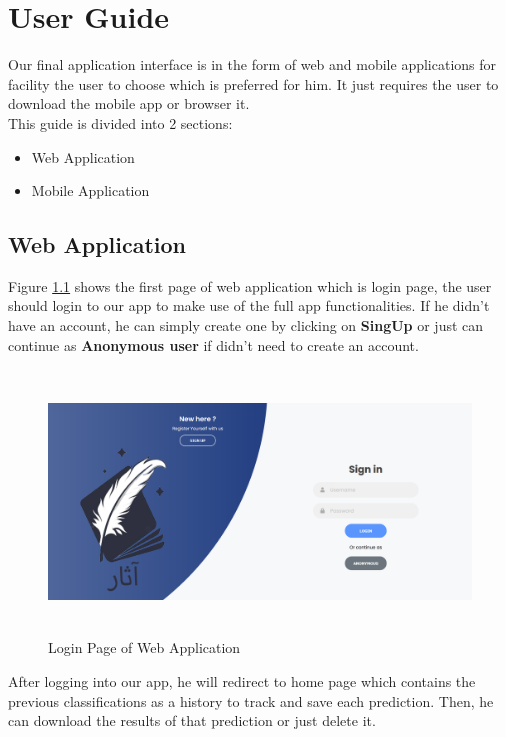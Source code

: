\chapter{User Guide}
Our final application interface is in the form of web and mobile applications for facility the user to choose which is preferred for him. It just requires the user to download the mobile app or browser it. \\

\noindent
This guide is divided into 2 sections:
\begin{itemize}[itemsep=1pt, topsep=5pt]
    \item Web Application
    \item Mobile Application
\end{itemize}

\section{Web Application}
Figure \ref{fig:web-login-page} shows the first page of web application which is login page, the user should login to our app to make use of the full app functionalities. If he didn't have an account, he can simply create one by clicking on \textbf{SingUp} or just can continue as \textbf{Anonymous user} if didn't need to create an account.

\begin{figure}[!htb]
    \centering
    \includegraphics[width=17cm,height=7cm]{images/app/web/web-1.PNG}
    \caption{Login Page of Web Application}
    \label{fig:web-login-page}
\end{figure}

After logging into our app, he will redirect to home page which contains the previous classifications as a history to track and save each prediction. Then, he can download the results of that prediction or just delete it.

